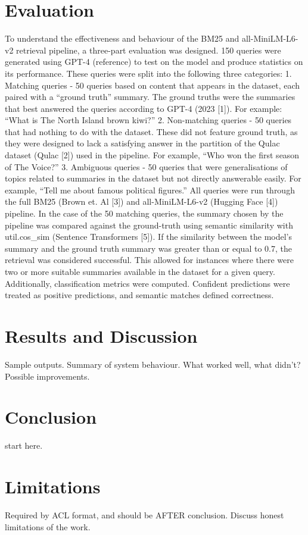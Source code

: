 \documentclass[11pt]{article}
\begin{document}
\section{Evaluation}
To understand the effectiveness and behaviour of the BM25 and all-MiniLM-L6-v2 retrieval pipeline, a three-part evaluation was designed. 150 queries were generated using GPT-4 (reference) to test on the model and produce statistics on its performance. These queries were split into the following three categories:
1. Matching queries - 50 queries based on content that appears in the dataset, each paired with a “ground truth” summary. The ground truths were the summaries that best answered the queries according to GPT-4 (2023 [1]). For example: “What is The North Island brown kiwi?”
2. Non-matching queries - 50 queries that had nothing to do with the dataset. These did not feature ground truth, as they were designed to lack a satisfying answer in the partition of the Qulac dataset (Qulac [2]) used in the pipeline. For example, “Who won the first season of The Voice?”
3. Ambiguous queries - 50 queries that were generalisations of topics related to summaries in the dataset but not directly answerable easily. For example, “Tell me about famous political figures.”
All queries were run through the full BM25 (Brown et. Al [3]) and all-MiniLM-L6-v2 (Hugging Face [4]) pipeline. In the case of the 50 matching queries, the summary chosen by the pipeline was compared against the ground-truth using semantic similarity with util.cos_sim (Sentence Transformers [5]). If the similarity between the model’s summary and the ground truth summary was greater than or equal to 0.7, the retrieval was considered successful. This allowed for instances where there were two or more suitable summaries available in the dataset for a given query. Additionally, classification metrics were computed. Confident predictions were treated as positive predictions, and semantic matches defined correctness.

\section{Results and Discussion}
Sample outputs.
Summary of system behaviour.
What worked well, what didn't?
Possible improvements.

\section{Conclusion}
start here.

\section*{Limitations}
Required by ACL format, and should be AFTER conclusion.
Discuss honest limitations of the work.
\end{document}
